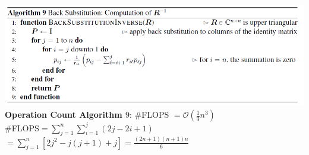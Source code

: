 \documentclass[english]{latex4ei/latex4ei_sheet}
\begin{document}
\begin{sectionbox}
    \includegraphics[width=\textwidth]{img/algo9_R_inverse.png}\\
    \textbf{Operation Count Algorithm $9$}: \#FLOPS $=\mathcal{O}(\frac{1}{3}n^3)$\\

    \#FLOPS$=\sum_{j=1}^{n}\sum_{i=1}^{j}(2j-2i+1)$\\
    $=\sum_{j=1}^{n}[2j^2-j(j+1)+j] = \frac{(2n+1)(n+1)n}{6}$
\end{sectionbox}
\end{document}
